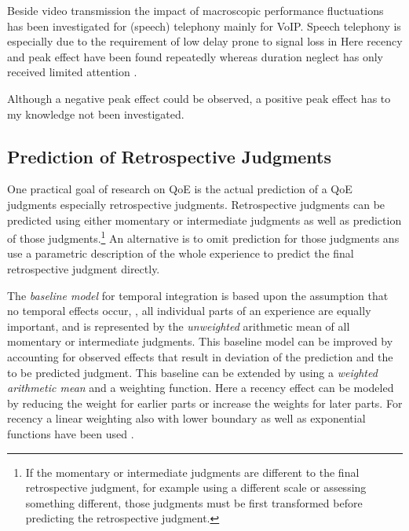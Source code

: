Beside video transmission the impact of macroscopic performance fluctuations has been investigated for (speech) telephony mainly for \ac{VoIP}.
Speech telephony is especially due to the requirement of low delay prone to signal loss in 
Here recency and peak effect have been found repeatedly \citep[\cf,][]{rosenbluth_testing_1998, hamberg_time-varying_1999, gros_instantaneous_2001, gros_effects_2004, belmudez_assessment_2014, weiss_modeling_2009, lewcio_management_2012} whereas duration neglect has only received limited attention \citep[\cf,][]{rosenbluth_testing_1998}.

Although a negative peak effect could be observed, a positive peak effect has to my knowledge not been investigated.

\subsection{Prediction of Retrospective Judgments}
One practical goal of research on \ac{QoE} is the actual prediction of a \ac{QoE} judgments especially retrospective judgments.
Retrospective judgments can be predicted using either momentary or intermediate judgments as well as prediction of those judgments.\footnote{If the momentary or intermediate judgments are different to the final retrospective judgment, for example using a different scale or assessing something different, those judgments must be first transformed before predicting the retrospective judgment.}
An alternative is to omit prediction for those judgments ans use a parametric description of the whole experience to predict the final retrospective judgment directly.

The \emph{baseline model} for temporal integration is based upon the assumption that no temporal effects occur, \ie, all individual parts of an experience are equally important, and is represented by the \emph{unweighted} arithmetic mean of all momentary or intermediate judgments.
This baseline model can be improved by accounting for observed effects that result in deviation of the prediction and the to be predicted judgment.
This baseline can be extended by using a \emph{weighted arithmetic mean} and a weighting function.
Here a recency effect can be modeled by reducing the weight for earlier parts \citep[\cf,][]{rosenbluth_testing_1998, weiss_modeling_2009, hamberg_time-varying_1999} or increase the weights for later parts.
For recency a linear weighting also with lower boundary \citep[\eg,][]{weiss_modeling_2009} as well as exponential functions have been used \cite[\eg,][]{hamberg_time-varying_1999}.

